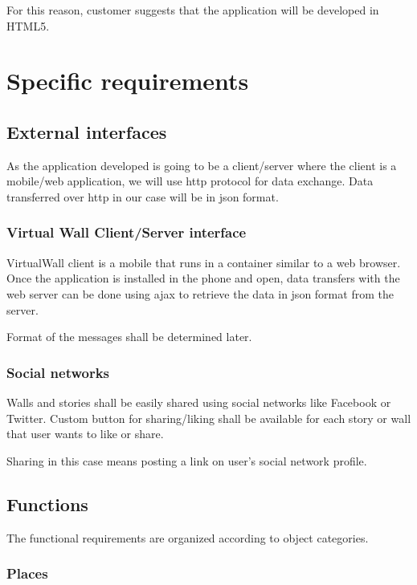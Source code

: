 \documentclass[11pt]{book}
\begin{document}
For this reason, customer suggests that the application will be developed in HTML5.

\section{Specific requirements}\label{sec:req_specific_requirements}

\subsection{External interfaces}
As the application developed is going to be a client/server where the client is a mobile/web application, we will use \gls{http} protocol for data exchange. Data transferred over \gls{http} in our case will be in \gls{json} format.

\subsubsection{Virtual Wall Client/Server interface}
VirtualWall client is a mobile that runs in a container similar to a web browser. Once the application is installed in the phone and open, data transfers with the web server can be done using \gls{ajax} to retrieve the data in \gls{json} format from the server.

Format of the messages shall be determined later. %

\subsubsection{Social networks}\label{sec:req_social_networks}
Walls and stories shall be easily shared using social networks like Facebook or Twitter. Custom button for sharing/liking shall be available for each story or wall that user wants to like or share.

Sharing in this case means posting a link on user's social network profile.

\subsection{Functions}
The functional requirements are organized according to object categories.


\subsubsection{Places}
\end{document}
